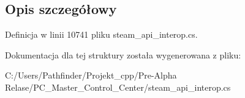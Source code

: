 \subsection{Opis szczegółowy}


Definicja w linii 10741 pliku steam\+\_\+api\+\_\+interop.\+cs.



Dokumentacja dla tej struktury została wygenerowana z pliku\+:\begin{DoxyCompactItemize}
\item 
C\+:/\+Users/\+Pathfinder/\+Projekt\+\_\+cpp/\+Pre-\/\+Alpha Relase/\+P\+C\+\_\+\+Master\+\_\+\+Control\+\_\+\+Center/steam\+\_\+api\+\_\+interop.\+cs\end{DoxyCompactItemize}
